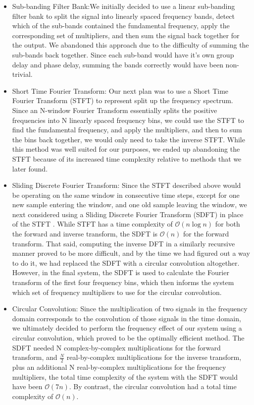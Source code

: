 \documentclass[12pt]{article}
\begin{document}
\begin{itemize}
\item Sub-banding Filter Bank:We initially decided to use a linear sub-banding filter bank to split the signal into linearly spaced frequency bands, detect which of the sub-bands contained the fundamental frequency, apply the corresponding set of multipliers, and then sum the signal back together for the output. We abandoned this approach due to the difficulty of summing the sub-bands back together. Since each sub-band would have it's own group delay and phase delay, summing the bands correctly would have been non-trivial.

\item Short Time Fourier Transform: Our next plan was to use a Short Time Fourier Transform (STFT) to represent split up the frequency spectrum. Since an N-window Fourier Transform essentially splits the positive frequencies into N linearly spaced frequency bins, we could use the STFT to find the fundamental frequency, and apply the multipliers, and then to sum the bins back together, we would only need to take the inverse STFT. While this method was well suited for our purposes, we ended up abandoning the STFT because of its increased time complexity relative to methods that we later found.

\item Sliding Discrete Fourier Transform: Since the STFT described above would be operating on the same window in consecutive time steps, except for one new sample entering the window, and one old sample leaving the window, we next considered using a Sliding Discrete Fourier Transform (SDFT) in place of the STFT \cite{SDFT}. While STFT has a time complexity of $\mathcal{O}(n\log{}n)$ for both the forward and inverse transform, the SDFT is $\mathcal{O}(n)$ for the forward transform. That said, computing the inverse DFT in a similarly recursive manner proved to be more difficult, and by the time we had figured out a way to do it, we had replaced the SDFT with a circular convolution altogether. However, in the final system, the SDFT is used to calculate the Fourier transform of the first four frequency bins, which then informs the system which set of frequency multipliers to use for the circular convolution.

\item Circular Convolution: Since the multiplication of two signals in the frequency domain corresponds to the convolution of those signals in the time domain, we ultimately decided to perform the frequency effect of our system using a circular convolution, which proved to be the optimally efficient method. The SDFT needed N complex-by-complex multiplications for the forward transform, and $\frac{N}{2}$ real-by-complex multiplications for the inverse transform, plus an additional N real-by-complex multiplications for the frequency multipliers, the total time complexity of the system with the SDFT would have been $\mathcal{O}(7n)$. By contrast, the circular convolution had a total time complexity of $\mathcal{O}(n)$.
\newline\newline\newline
\end{itemize}
\end{document}

